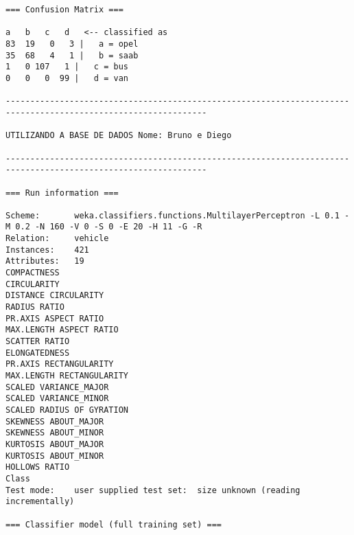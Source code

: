 \documentclass[
	article,			%
	11pt,				%
	oneside,			%
	a4paper,			%
	english,			%
	brazil,				%
	sumario=tradicional
	]{abntex2}
\begin{document}
\begin{lstlisting}
=== Confusion Matrix ===

a   b   c   d   <-- classified as
83  19   0   3 |   a = opel
35  68   4   1 |   b = saab
1   0 107   1 |   c = bus
0   0   0  99 |   d = van

---------------------------------------------------------------------------------------------------------------

UTILIZANDO A BASE DE DADOS Nome: Bruno e Diego

---------------------------------------------------------------------------------------------------------------

=== Run information ===

Scheme:       weka.classifiers.functions.MultilayerPerceptron -L 0.1 -M 0.2 -N 160 -V 0 -S 0 -E 20 -H 11 -G -R
Relation:     vehicle
Instances:    421
Attributes:   19
COMPACTNESS
CIRCULARITY
DISTANCE CIRCULARITY
RADIUS RATIO
PR.AXIS ASPECT RATIO
MAX.LENGTH ASPECT RATIO
SCATTER RATIO
ELONGATEDNESS
PR.AXIS RECTANGULARITY
MAX.LENGTH RECTANGULARITY
SCALED VARIANCE_MAJOR
SCALED VARIANCE_MINOR
SCALED RADIUS OF GYRATION
SKEWNESS ABOUT_MAJOR
SKEWNESS ABOUT_MINOR
KURTOSIS ABOUT_MAJOR
KURTOSIS ABOUT_MINOR
HOLLOWS RATIO
Class
Test mode:    user supplied test set:  size unknown (reading incrementally)

=== Classifier model (full training set) ===


\end{lstlisting}
\end{document}
